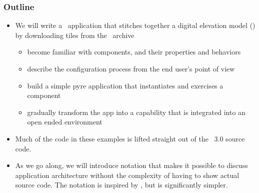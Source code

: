 %
%

\begin{frame}
%
  \frametitle{Outline}
%
  \begin{itemize}
%
  \item We will write a \pyre\ application that stitches together a digital elevation model
    (\dem) by downloading tiles from the \srtm\ archive
%
    \begin{itemize}
    \item become familiar with components, and their properties and behaviors
    \item describe the configuration process from the end user's point of view
    \item build a simple pyre application that instantiates and exercises a component
    \item gradually transform the app into a capability that is integrated into an open ended
      environment
    \end{itemize}
%
  \item Much of the code in these examples is lifted straight out of the \isce\ 3.0 source
    code.
%
  \item As we go along, we will introduce notation that makes it possible to discuss
    application architecture without the complexity of having to show actual source code. The
    notation is inspired by \uml\cite{uml-2005}, but is significantly simpler.
%
  \end{itemize}
%
\end{frame}

